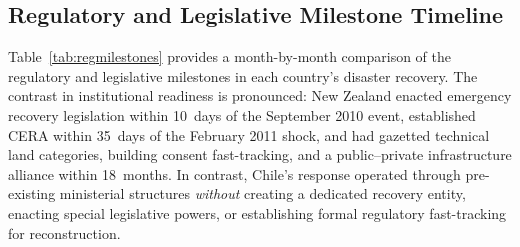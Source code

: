 \subsection{Regulatory and Legislative Milestone Timeline}

Table~\ref{tab:regmilestones} provides a month-by-month comparison of the regulatory and legislative milestones in each country's disaster recovery. The contrast in institutional readiness is pronounced: New Zealand enacted emergency recovery legislation within 10~days of the September 2010 event, established CERA within 35~days of the February 2011 shock, and had gazetted technical land categories, building consent fast-tracking, and a public--private infrastructure alliance within 18~months. In contrast, Chile's response operated through pre-existing ministerial structures \textit{without} creating a dedicated recovery entity, enacting special legislative powers, or establishing formal regulatory fast-tracking for reconstruction.

